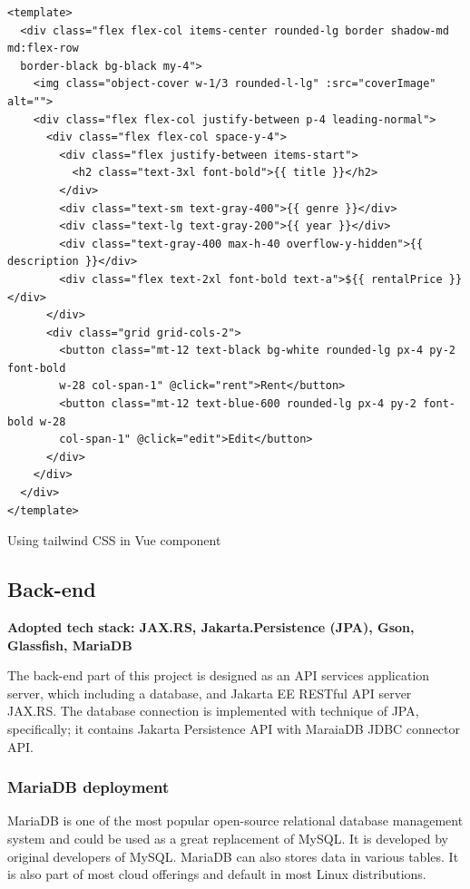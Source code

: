 \documentclass{article}
\begin{document}
\begin{listing}[!htp]
\begin{verbatim}
<template>
  <div class="flex flex-col items-center rounded-lg border shadow-md md:flex-row
  border-black bg-black my-4">
    <img class="object-cover w-1/3 rounded-l-lg" :src="coverImage" alt="">
    <div class="flex flex-col justify-between p-4 leading-normal">
      <div class="flex flex-col space-y-4">
        <div class="flex justify-between items-start">
          <h2 class="text-3xl font-bold">{{ title }}</h2>
        </div>
        <div class="text-sm text-gray-400">{{ genre }}</div>
        <div class="text-lg text-gray-200">{{ year }}</div>
        <div class="text-gray-400 max-h-40 overflow-y-hidden">{{ description }}</div>
        <div class="flex text-2xl font-bold text-a">${{ rentalPrice }}</div>
      </div>
      <div class="grid grid-cols-2">
        <button class="mt-12 text-black bg-white rounded-lg px-4 py-2 font-bold
        w-28 col-span-1" @click="rent">Rent</button>
        <button class="mt-12 text-blue-600 rounded-lg px-4 py-2 font-bold w-28
        col-span-1" @click="edit">Edit</button>
      </div>
    </div>
  </div>
</template>
\end{verbatim}
\caption{Using tailwind CSS in Vue component}
\label{listing:movie-card}
\end{listing}

\subsection{Back-end}
\textbf{Adopted tech stack: JAX.RS, Jakarta.Persistence (JPA), Gson, Glassfish, MariaDB}

The back-end part of this project is designed as an API services application server, which including a database, and Jakarta EE RESTful API server JAX.RS. The database connection is implemented with technique of JPA, specifically; it contains Jakarta Persistence API with MaraiaDB JDBC connector API.


\subsubsection{MariaDB deployment}

MariaDB is one of the most popular open-source relational database management system and could be used as a great replacement of MySQL. It is developed by original developers of MySQL. MariaDB can also stores data in various tables. It is also part of most cloud offerings and default in most Linux distributions. \cite{mariadb}
\end{document}
